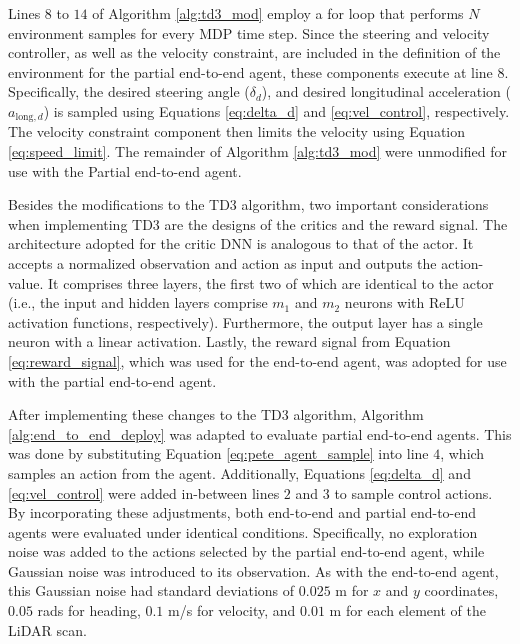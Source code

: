 Lines $8$ to $14$ of Algorithm \ref{alg:td3_mod} employ a for loop that performs $N$ environment samples for every MDP time step.
Since the steering and velocity controller, as well as the velocity constraint, are included in the definition of the environment for the partial end-to-end agent, 
these components execute at line $8$.
Specifically, the desired steering angle ($\delta_d$), and desired longitudinal acceleration ($a_{\text{long},d}$) is sampled using Equations \ref{eq:delta_d} and \ref{eq:vel_control}, respectively.
The velocity constraint component then limits the velocity using Equation \ref{eq:speed_limit}.
The remainder of Algorithm \ref{alg:td3_mod} were unmodified for use with the Partial end-to-end agent.

Besides the modifications to the TD3 algorithm, two important considerations when implementing TD3 are the designs of the critics and the reward signal.
The architecture adopted for the critic DNN is analogous to that of the actor.
It accepts a normalized observation and action as input and outputs the action-value.
It comprises three layers, the first two of which are identical to the actor (i.e., the input and hidden layers comprise $m_1$ and $m_2$ neurons with ReLU activation functions, respectively).
Furthermore, the output layer has a single neuron with a linear activation.
Lastly, the reward signal from Equation \ref{eq:reward_signal}, which was used for the end-to-end agent, was adopted for use with the partial end-to-end agent. 



After implementing these changes to the TD3 algorithm, Algorithm \ref{alg:end_to_end_deploy} was adapted to evaluate partial end-to-end agents.
This was done by substituting Equation \ref{eq:pete_agent_sample} into line $4$, which samples an action from the agent. 
Additionally, Equations \ref{eq:delta_d} and \ref{eq:vel_control} were added in-between lines $2$ and $3$ to sample control actions.
By incorporating these adjustments, both end-to-end and partial end-to-end agents were evaluated under identical conditions. 
Specifically, no exploration noise was added to the actions selected by the partial end-to-end agent, while Gaussian noise was introduced to its observation.
As with the end-to-end agent, this Gaussian noise had standard deviations of $0.025$ m for $x$ and $y$ coordinates, $0.05$ rads for heading, $0.1$ m/s for velocity, and $0.01$ m for each element of the LiDAR scan. 











